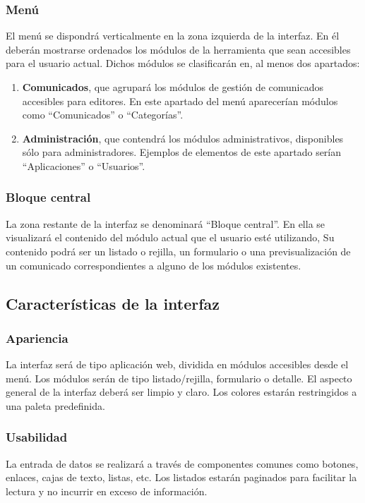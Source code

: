\subsubsection*{Menú}
El menú se dispondrá verticalmente en la zona izquierda de la interfaz. En él deberán mostrarse ordenados los módulos de la herramienta que sean accesibles para el usuario actual. Dichos módulos se clasificarán en, al menos dos apartados: 

\begin{enumerate}
  \item \textbf{Comunicados}, que agrupará los módulos de gestión de comunicados accesibles para editores. En este apartado del menú aparecerían módulos como ``Comunicados'' o ``Categorías''.
  \item \textbf{Administración}, que contendrá los módulos administrativos, disponibles sólo para administradores. Ejemplos de elementos de este apartado serían ``Aplicaciones'' o ``Usuarios''.
\end{enumerate}

\subsubsection*{Bloque central}
La zona restante de la interfaz se denominará ``Bloque central''. En ella se visualizará el contenido del módulo actual que el usuario esté utilizando, Su contenido podrá ser un listado o rejilla, un formulario o una previsualización de un comunicado correspondientes a alguno de los módulos existentes.

\subsection{Características de la interfaz}
\subsubsection*{Apariencia}
La interfaz será de tipo aplicación web, dividida en módulos accesibles desde el menú. Los módulos serán de tipo listado/rejilla, formulario o detalle. El aspecto general de la interfaz deberá ser limpio y claro. Los colores estarán restringidos a una paleta predefinida.
\subsubsection*{Usabilidad}
La entrada de datos se realizará a través de componentes comunes como botones, enlaces, cajas de texto, listas, etc. Los listados estarán paginados para facilitar la lectura y no incurrir en exceso de información.
